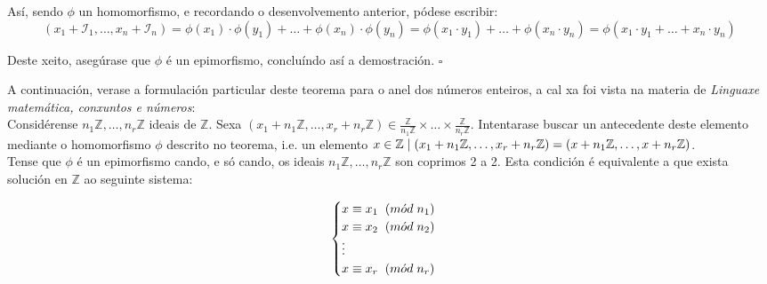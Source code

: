 \documentclass[twoside]{report}
\theoremstyle{mystyle}
\begin{document}
\noindent Así, sendo $\phi$ un homomorfismo, e recordando o desenvolvemento anterior, pódese escribir:
$$(x_{1} + \mathcal{I}_{1}, \ldots, x_{n} + \mathcal{I}_{n}) = \phi(x_{1}) \cdot \phi(y_{1}) + \ldots + \phi(x_{n}) \cdot \phi(y_{n}) = \phi(x_{1} \cdot y_{1}) + \ldots + \phi(x_{n} \cdot y_{n}) = \phi(x_{1} \cdot y_{1} + \ldots + x_{n} \cdot y_{n})$$

\noindent Deste xeito, asegúrase que $\phi$ é un epimorfismo, concluíndo así a demostración. $\square$\\

\vspace{3mm}

\noindent A continuación, verase a formulación particular deste teorema para o anel dos números enteiros, a cal xa foi vista na materia de \textit{Linguaxe matemática, conxuntos e números}:\\

\noindent Considérense $n_{1}\mathbb{Z}, \ldots, n_{r}\mathbb{Z}$ ideais de $\mathbb{Z}$. Sexa $(x_{1} + n_{1}\mathbb{Z}, \ldots, x_{r} + n_{r}\mathbb{Z}) \in \displaystyle \frac{\mathbb{Z}}{n_{1}\mathbb{Z}} \times \ldots \times \displaystyle \frac{\mathbb{Z}}{n_{r}\mathbb{Z}}$. Intentarase buscar un antecedente deste elemento mediante o homomorfismo $\phi$ descrito no teorema, i.e. un elemento $x \in \mathbb{Z} \hspace{1mm} | \hspace{1mm} (x_{1} + n_{1}\mathbb{Z}, \ldots, x_{r} + n_{r}\mathbb{Z}) = (x + n_{1}\mathbb{Z}, \ldots, x + n_{r}\mathbb{Z})$.\\

\noindent Tense que $\phi$ é un epimorfismo cando, e só cando, os ideais $n_{1}\mathbb{Z}, \ldots, n_{r}\mathbb{Z}$ son coprimos 2 a 2. Esta condición é equivalente a que exista solución en $\mathbb{Z}$ ao seguinte sistema:

$$
\begin{cases}
x \equiv x_{1} \hspace{2mm} (m\acute{o}d \hspace{1mm} n_{1})\\
x \equiv x_{2} \hspace{2mm} (m\acute{o}d \hspace{1mm} n_{2})\\
\vdots \\
x \equiv x_{r} \hspace{2mm} (m\acute{o}d \hspace{1mm} n_{r})
\end{cases}
$$
\end{document}
